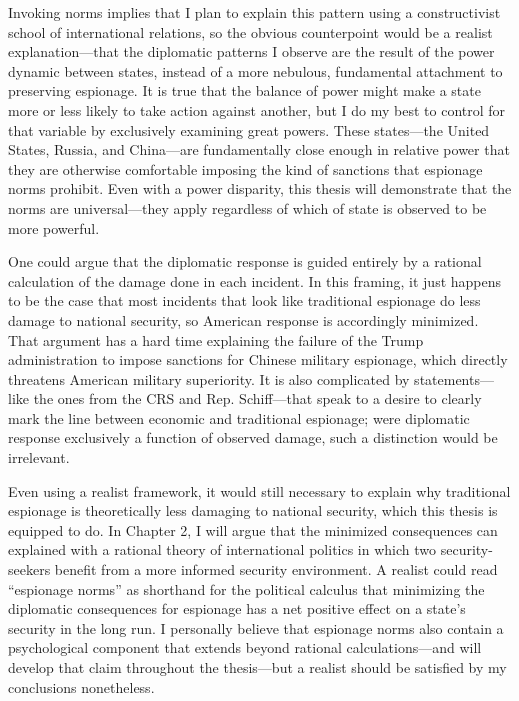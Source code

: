 \documentclass{memoir}
\begin{document}
\begin{refsegment}
Invoking norms implies that I plan to explain this pattern using a constructivist school of international relations, so the obvious counterpoint would be a realist explanation---that the diplomatic patterns I observe are the result of the power dynamic between states, instead of a more nebulous, fundamental attachment to preserving espionage. It is true that the balance of power might make a state more or less likely to take action against another, but I do my best to control for that variable by exclusively examining great powers. These states---the United States, Russia, and China---are fundamentally close enough in relative power that they are otherwise comfortable imposing the kind of sanctions that espionage norms prohibit. Even with a power disparity, this thesis will demonstrate that the norms are universal---they apply regardless of which of state is observed to be more powerful.

One could argue that the diplomatic response is guided entirely by a rational calculation of the damage done in each incident. In this framing, it just happens to be the case that most incidents that look like traditional espionage do less damage to national security, so American response is accordingly minimized. That argument has a hard time explaining the failure of the Trump administration to impose sanctions for Chinese military espionage, which directly threatens American military superiority. It is also complicated by statements---like the ones from the CRS and Rep. Schiff---that speak to a desire to clearly mark the line between economic and traditional espionage; were diplomatic response exclusively a function of observed damage, such a distinction would be irrelevant.

Even using a realist framework, it would still necessary to explain why traditional espionage is theoretically less damaging to national security, which this thesis is equipped to do. In Chapter 2, I will argue that the minimized consequences can explained with a rational theory of international politics in which two security-seekers benefit from a more informed security environment. A realist could read ``espionage norms'' as shorthand for the political calculus that minimizing the diplomatic consequences for espionage has a net positive effect on a state's security in the long run. I personally believe that espionage norms also contain a psychological component that extends beyond rational calculations---and will develop that claim throughout the thesis---but a realist should be satisfied by my conclusions nonetheless.



\end{refsegment}
\end{document}
